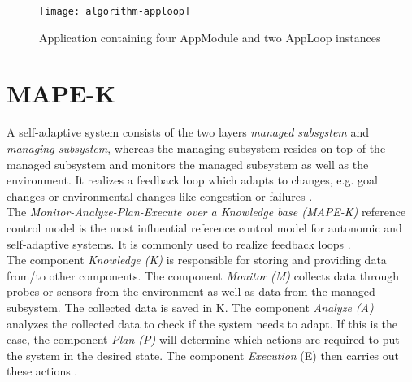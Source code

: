 \begin{figure}[htb]
    \centering
    \texttt{[image: algorithm-apploop]}
    \caption{Application containing four AppModule and two AppLoop instances}
    \label{fig:apploop}
\end{figure}

\section{MAPE-K}
A self-adaptive system consists of the two layers \textit{managed subsystem} and \textit{managing subsystem}, whereas the managing subsystem resides on top of the managed subsystem and monitors the managed subsystem as well as the environment.
It realizes a feedback loop which adapts to changes, e.g. goal changes or environmental changes like congestion or failures \cite{mape-k}.\\

The \textit{Monitor-Analyze-Plan-Execute over a Knowledge base (MAPE-K)} \cite{autonomic-computing} reference control model is the most influential reference control model for autonomic and self-adaptive systems.
It is commonly used to realize feedback loops \cite{mape-k}.\\

The component \textit{Knowledge (K)} is responsible for storing and providing data from/to other components.
The component \textit{Monitor (M)} collects data through probes or sensors from the environment as well as data from the managed subsystem.
The collected data is saved in K.
The component \textit{Analyze (A)} analyzes the collected data to check if the system needs to adapt.
If this is the case, the component \textit{Plan (P)} will determine which actions are required to put the system in the desired state.
The component \textit{Execution} (E) then carries out these actions \cite{mape-k}.
